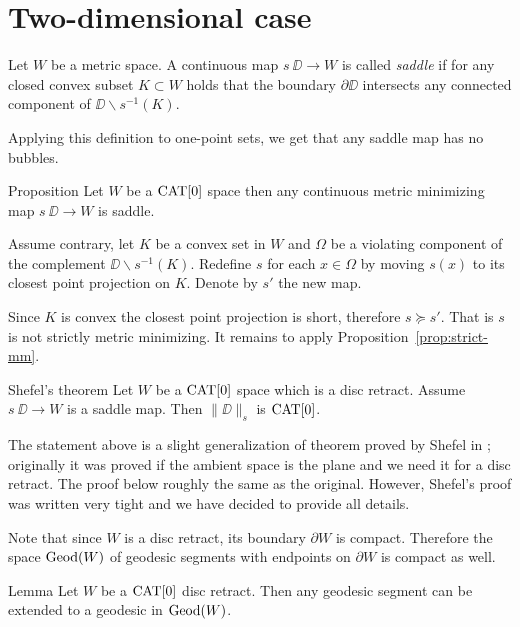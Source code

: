 \documentclass[a4paper,10pt]{amsart}
\begin{document}
\section{Two-dimensional case}

Let $W$ be a metric space.
A continuous map $s\:\DD\to W$ is called \emph{saddle} if for any closed convex subset $K\subset W$ holds that
the boundary $\partial \DD$ intersects
any connected component of $\DD\backslash s^{-1}(K)$.

Applying this definition to one-point sets,
we get that any saddle map has no bubbles.


\begin{thm}{Proposition}\label{prop:memisaddle}
Let $W$ be a $\mathop{\rm CAT}\nolimits[0]$ space then any continuous metric minimizing map $s\:\DD\to W$ is saddle.
\end{thm}

Assume contrary, let $K$ be a convex set in $W$
and $\Omega$ be a violating component of the complement $\DD\backslash s^{-1}(K)$.
Redefine $s$ for each $x\in\Omega$ by moving 
$s(x)$ to its closest point projection on $K$.
Denote by $s'$ the new map.

Since $K$ is convex the closest point projection is short,
therefore $s\succcurlyeq s'$.
That is $s$ is not strictly metric minimizing.
It remains to apply Proposition~\ref{prop:strict-mm}.
\qeds

 






\begin{thm}{Shefel's theorem}\label{thm:shefel-2D}
Let $W$ be a $\mathop{\rm CAT}\nolimits[0]$ space which is a disc retract.
Assume $s\:\DD\to W$ is a saddle map. 
Then $\|\DD\|_s$ is $\mathop{\rm CAT}\nolimits[0]$.
\end{thm}

The statement above is a slight generalization of theorem proved by Shefel in \cite{shefel-2D};
originally it was proved if the ambient space is the plane and we need it for a disc retract.
The proof below roughly the same as the original.
However, Shefel's proof was written very tight
and we have decided to provide all details.


Note that since $W$ is a disc retract, its boundary $\partial W$ is compact. Therefore
the space $\mathop{\rm Geod}\nolimits(W)$ of geodesic segments with endpoints on $\partial W$ is compact as well.

\begin{thm}{Lemma}\label{lem:extension}
Let $W$ be a $\mathop{\rm CAT}\nolimits[0]$  disc retract. Then any geodesic segment can be extended to a geodesic in $\mathop{\rm Geod}\nolimits(W)$.
\end{thm}
\end{document}
